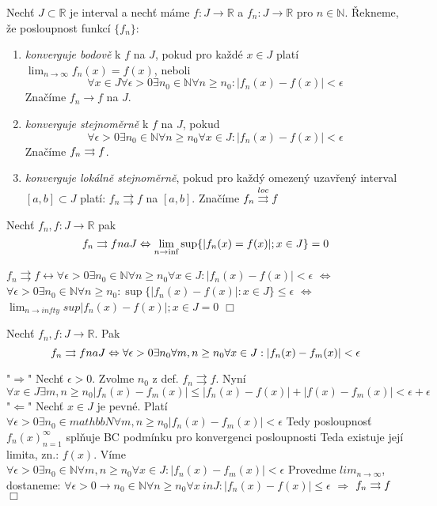 \begin{definice}
Nechť $J \subset \mathbb{R}$ je interval a nechť máme $f : J \rightarrow \mathbb{R}$ a $f_n : J \rightarrow \mathbb{R}$ pro $n \in \mathbb{N}$. Řekneme, že posloupnost funkcí $\{f_n\}$:

\begin{enumerate}
\item \emph{konverguje bodově} k $f$ na $J$, pokud pro každé $x \in J$ platí $\lim_{n \rightarrow \infty} f_n(x) = f(x)$, neboli
$$\forall x \in J \forall \epsilon > 0 \exists n_0 \in \mathbb{N} \forall n \geq n_0 : |f_n(x) - f(x)| < \epsilon$$
Značíme $f_n \rightarrow f$ na $J$.
\item \emph{konverguje stejnoměrně} k $f$ na $J$, pokud
$$\forall \epsilon > 0 \exists n_0 \in \mathbb{N} \forall n \geq n_0 \forall x \in J : | f_n(x) - f(x) | < \epsilon$$
Značíme $f_n \rightrightarrows f$.
\item \emph{konverguje lokálně stejnoměrně}, pokud pro každý omezený uzavřený interval $[a, b] \subset J$ platí: $f_n \rightrightarrows f$ na $[a, b]$. Značíme $f_n \overset{loc}{\rightrightarrows} f$
\end{enumerate}
\end{definice}

\begin{vetal}
Nechť $f_n, f:J \rightarrow \mathbb{R}$ pak
$$f_n \rightrightarrows f na J \Leftrightarrow \lim_{n \rightarrow \inf} \sup \{ |f_n(x) = f(x)|; x \in J \} = 0$$
\begin{dukaz}
$f_n \rightrightarrows f \leftrightarrow \forall \epsilon > 0 \exists n_0 \in \mathbb{N} \forall n \geq n_0 \forall x \in J: |f_n(x) - f(x)| < \epsilon$
$\Leftrightarrow$
$\forall \epsilon > 0 \exists n_0 \in \mathbb{N} \forall n \geq n_0 : \sup \{ |f_n(x) - f(x) | : x \in J \} \leq \epsilon$
$\Leftrightarrow$
$\lim_{n \to infty} sup{|f_n(x)-f(x)|;x \in J} = 0$
$\Box$
\end{dukaz}
\end{vetal}

\begin{vetat}
Nechť $f_n,f : J \rightarrow \mathbb{R}$. Pak
$$f_n \rightrightarrows f na J \Leftrightarrow \forall \epsilon > 0 \exists n_0 \forall m,n \geq n_0 \forall x \in J : | f_n(x) - f_m(x)| < \epsilon$$
\begin{dukaz}
"$\Rightarrow$" 
Nechť $\epsilon > 0.$ Zvolme $n_0$ z def. $f_n \rightrightarrows f.$ 
Nyní $\forall x \in J \exists m,n \geq n_0 |f_n(x) - f_m(x) | \leq |f_n(x) - f(x)| + |f(x) - f_m(x)| < \epsilon + \epsilon $
"$\Leftarrow$"
Nechť $x \in J$ je pevné. Platí $\forall \epsilon > 0 \exists n_0 \in mathbb{N} \forall m,n \geq n_0|f_n(x) - f_m(x)| < \epsilon$
Tedy posloupnosť ${f_n(x)}_{n=1}^\infty$ splňuje BC podmínku pro konvergenci posloupnosti Teda existuje její limita, zn.: $f(x)$.
Víme $\forall \epsilon > 0 \exists n_0 \in \mathbb{N} \forall m,n \geq n_0 \forall x \in J: |f_n(x)-f_m(x)|<\epsilon$
Provedme $lim_{n \to \infty}$, dostaneme:
$\forall \epsilon > 0 \rightarrow n_0 \in \mathbb{N} \forall n \geq n_0 \forall x\ in J: |f_n(x) - f(x)| \leq \epsilon$
$\Rightarrow$
$f_n \rightrightarrows f$
$\Box$
\end{dukaz}
\end{vetat}

